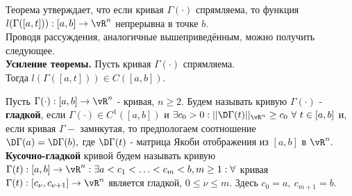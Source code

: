 \documentclass[main]{subfiles}
\begin{document}
Теорема утверждает, что если кривая $\Gamma(\cdot)$ спрямляема, то функция $l(\Gamma([a,t])):[a,b]\rightarrow \vR^n$ непрерывна в точке $b.$ \\
Проводя рассуждения, аналогичные вышеприведённым, можно получить следующее.\\
\textbf{Усиление теоремы.} Пусть кривая $\Gamma(\cdot)$ спрямляема.\\
Тогда $l(\Gamma([a,t]))\in C([a,b]).$\\

\begin{definition}
    Пусть $\Gamma(\cdot):[a,b]\rightarrow{\vR^n}$ - кривая, $n\geq 2.$
    Будем называть кривую $\Gamma(\cdot)$ - \textbf{гладкой},
    если $\Gamma(\cdot)\in C^1([a,b])$ и $\exists c_0>0: ||\D\Gamma(t)||_{\vR^n}\geq c_0\ \forall\ t\in[a,b]$ и, если кривая $\Gamma - $ замнкутая,
    то предпологаем соотношение\\ $\D\Gamma(a)=\D\Gamma(b),$ где $\D\Gamma(t)$ -
    матрица Якоби отображения из $[a,b]$ в ${\vR^n}.$
    \textbf{Кусочно-гладкой} кривой будем называть кривую $\Gamma(t): [a,b]\to {\vR^n}: \exists a<c_1< \ldots<c_m<b, m\geq 1:
        \forall$ кривая $\Gamma(t):[c_\nu,c_{\nu+1}]\to{\vR^n}$ является гладкой, $0\leq \nu\leq m.$ Здесь $c_0=a,\ c_{m+1}=b.$
\end{definition}
\end{document}
